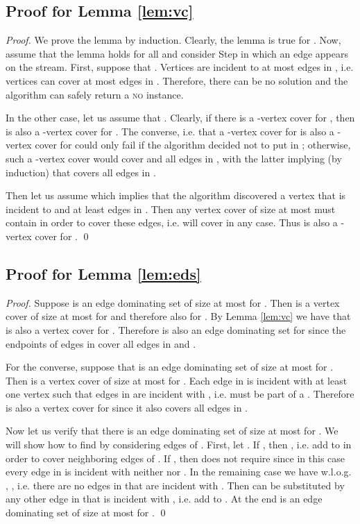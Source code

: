 \documentclass[draft,a4paper]{llncs}
\newcommand{\no}{\textsc{no}\xspace}
\begin{document}
\subsection{Proof for Lemma \ref{lem:vc}}

\begin{proof}
 We prove the lemma by induction. Clearly, the lemma is true for . Now, assume that the lemma holds for all  and consider Step  in which an edge  appears on the stream. First, suppose that . Vertices are incident to at most  edges in , i.e.  vertices can cover at most  edges in . Therefore, there can be no solution and the algorithm can safely return a \no instance. 
 
 In the other case, let us assume that . Clearly, if there is a -vertex cover  for , then  is also a -vertex cover for . 
 The converse, i.e. that a -vertex cover for  is also a -vertex cover for  could
 only fail if the algorithm decided not to put  in ; otherwise, such a -vertex cover  would cover  and all edges in , with the latter implying (by induction) that  covers all edges in .
 
 Then let us assume  which implies that the algorithm discovered a vertex  that is incident to  and at
 least  edges in . Then any vertex cover  of size at most  must contain  in order to cover these edges, i.e.
  will cover  in any case. Thus  is also a -vertex cover for . \qed \end{proof}
 
\subsection{Proof for Lemma \ref{lem:eds}}

\begin{proof}
 Suppose  is an edge dominating set of size at most  for . Then  is a vertex cover of size at most   for  and therefore also for . By Lemma \ref{lem:vc} we have that  is also a vertex cover for . Therefore  is also an edge dominating set for  since the endpoints of edges in  cover all edges in  and .
 
 For the converse, suppose that  is an edge dominating set of size at most  for . Then  is a vertex cover of size at most  for . Each edge in  is incident with at least one vertex  such that  edges in  are incident with , i.e.  must be part of a . Therefore  is also a vertex cover for  since it also covers all edges in .
 
 Now let us verify that there is an edge dominating set  of size at most  for . We will show how to find  by considering edges  of . First, let . If , then , i.e. add  to  in order to cover neighboring edges of .
 If , then  does not require  since in this case every edge in  is incident with neither  nor .
 In the remaining case we have w.l.o.g. , , i.e. there are no edges in  that
 are incident with . Then  can be substituted by any other edge  in  that is incident with , i.e. add  to . At the end  is an edge dominating set of size at most  for . \qed \end{proof}
\end{document}
